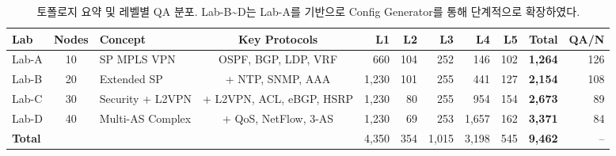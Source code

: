 \begin{table}[!t]
  \caption{토폴로지 요약 및 레벨별 QA 분포. Lab-B\textasciitilde D는 Lab-A를 기반으로 Config Generator를 통해 단계적으로 확장하였다.}
  \label{tab:topology-summary}
  \centering
  \small
  \begin{tabular}{lclcrrrrrrr}
    \toprule
    \textbf{Lab} & \textbf{Nodes} & \textbf{Concept} & \textbf{Key Protocols} & \textbf{L1} & \textbf{L2} & \textbf{L3} & \textbf{L4} & \textbf{L5} & \textbf{Total} & \textbf{QA/N} \\
    \midrule
    Lab-A & 10 & SP MPLS VPN      & OSPF, BGP, LDP, VRF       & 660   & 104 & 252 & 146   & 102 & \textbf{1,264} & 126 \\
    Lab-B & 20 & Extended SP      & + NTP, SNMP, AAA           & 1,230 & 101 & 255 & 441   & 127 & \textbf{2,154} & 108 \\
    Lab-C & 30 & Security + L2VPN & + L2VPN, ACL, eBGP, HSRP   & 1,230 & 80  & 255 & 954   & 154 & \textbf{2,673} & 89  \\
    Lab-D & 40 & Multi-AS Complex & + QoS, NetFlow, 3-AS       & 1,230 & 69  & 253 & 1,657 & 162 & \textbf{3,371} & 84  \\
    \midrule
    \multicolumn{4}{l}{\textbf{Total}} & 4,350 & 354 & 1,015 & 3,198 & 545 & \textbf{9,462} & --  \\
    \bottomrule
  \end{tabular}
\end{table}